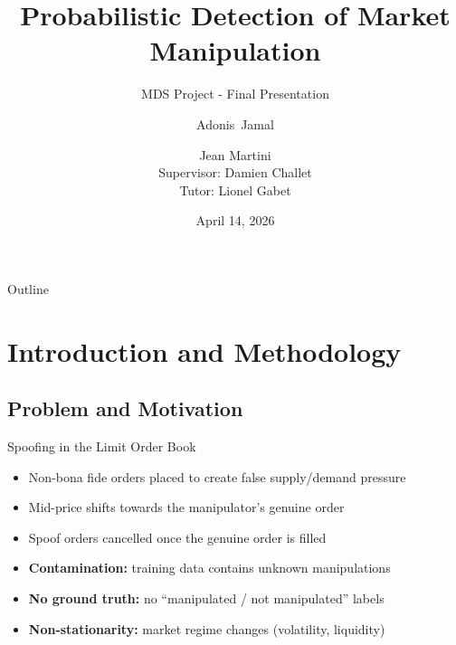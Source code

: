 \documentclass{beamer}
\title{Probabilistic Detection of Market Manipulation}
\subtitle{MDS Project - Final Presentation}
\author[Adonis Jamal \and Jean Martini]{Adonis~Jamal \and Jean Martini\\Supervisor: Damien Challet\\Tutor: Lionel Gabet}
\institute{CentraleSupélec, MICS Laboratory}
\date{April 14, 2026}
\begin{document}
\frame{\titlepage}

\begin{frame}{Outline}
    \tableofcontents[hideallsubsections]
\end{frame}


\section{Introduction and Methodology}
\subsection{Problem and Motivation}

\begin{frame}{Spoofing in the Limit Order Book}
    \begin{tcolorbox}[keybox, title=Mechanism]
        \begin{itemize}
            \item Non-bona fide orders placed to create false supply/demand pressure
            \item Mid-price shifts towards the manipulator's genuine order
            \item Spoof orders cancelled once the genuine order is filled
        \end{itemize}
    \end{tcolorbox}
    \begin{tcolorbox}[warnbox, title=Detection Challenges]
        \begin{itemize}
            \item \textbf{Contamination:} training data contains unknown manipulations
            \item \textbf{No ground truth:} no ``manipulated / not manipulated'' labels
            \item \textbf{Non-stationarity:} market regime changes (volatility, liquidity)
        \end{itemize}
    \end{tcolorbox}
\end{frame}
\end{document}
